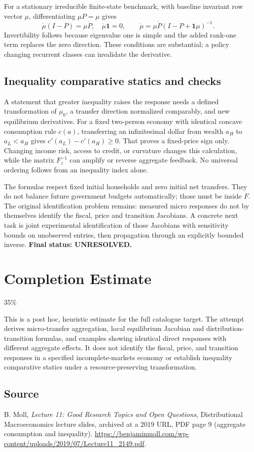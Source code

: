 \documentclass[11pt]{article}
\begin{document}
For a stationary irreducible finite-state benchmark, with baseline invariant
row vector $\mu$, differentiating $\mu P=\mu$ gives
\[
 \dot\mu(I-P)=\mu\dot P,\quad \dot\mu\mathbf1=0,
 \qquad
 \dot\mu=\mu\dot P(I-P+\mathbf1\mu)^{-1}.
\]
Invertibility follows because eigenvalue one is simple and the added
rank-one term replaces the zero direction. These conditions are substantial;
a policy changing recurrent classes can invalidate the derivative.

\subsection*{Inequality comparative statics and checks}
A statement that greater inequality raises the response needs a defined
transformation of $\mu_0$, a transfer direction normalized comparably, and
new equilibrium derivatives. For a fixed two-person economy with identical
concave consumption rule $c(a)$, transferring an infinitesimal dollar from
wealth $a_H$ to $a_L<a_H$ gives $c'(a_L)-c'(a_H)\geq0$. That proves a
fixed-price sign only. Changing income risk, access to credit, or curvature
changes this calculation, while the matrix $F_z^{-1}$ can amplify or
reverse aggregate feedback. No universal ordering follows from an inequality
index alone.

The formulas respect fixed initial households and zero initial net transfers.
They do not balance future government budgets automatically; those must be
inside $F$. The original identification problem remains: measured micro
responses do not by themselves identify the fiscal, price and transition
Jacobians. A concrete next task is joint experimental identification of those
Jacobians with sensitivity bounds on unobserved entries, then propagation
through an explicitly bounded inverse. \textbf{Final status: UNRESOLVED.}

\section{Completion Estimate}
35\%

This is a post hoc, heuristic estimate for the full catalogue target.
The attempt derives micro-transfer aggregation, local equilibrium Jacobian and distribution-transition formulas, and examples showing identical direct responses with different aggregate effects. It does not identify the fiscal, price, and transition responses in a specified incomplete-markets economy or establish inequality comparative statics under a resource-preserving transformation.

\subsection*{Source}
B. Moll, \emph{Lecture 11: Good Research Topics and Open Questions},
Distributional Macroeconomics lecture slides, archived at a 2019 URL,
PDF page 9 (aggregate consumption and inequality).
\url{https://benjaminmoll.com/wp-content/uploads/2019/07/Lecture11_2149.pdf}.
\end{document}

